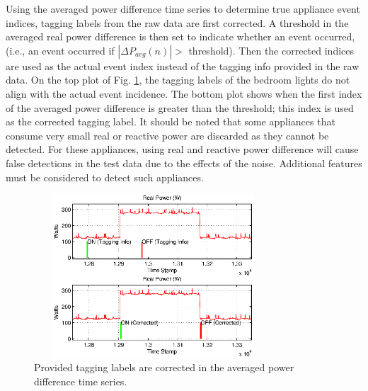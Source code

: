 \documentclass[conference]{IEEEtran}
\begin{document}
Using the averaged power difference time series to determine true appliance event indices, tagging labels from the raw data are first corrected.  A threshold in the averaged real power difference is then set to indicate whether an event occurred, (i.e., an event occurred if $|\Delta P_{avg}(n)| >$ threshold).  Then the corrected indices are used as the actual event index instead of the tagging info provided in the raw data.  On the top plot of Fig. \ref{fig:tagging}, the tagging labels of the bedroom lights do not align with the actual event incidence.  The bottom plot shows when the first index of the averaged power difference is greater than the threshold; this index is used as the corrected tagging label.  It should be noted that some appliances that consume very small real or reactive power are discarded as they cannot be detected.  For these appliances, using real and reactive power difference will cause false detections in the test data due to the effects of the noise.  Additional features must be considered to detect such appliances.

\begin{figure}[!t]
	\centering
	\includegraphics[height = 2.4in, width=3.5in]{fig/tagginginfo.eps}
	\caption{Provided tagging labels are corrected in the averaged power difference time series.}
	\label{fig:tagging}
\end{figure}
	
\end{document}
